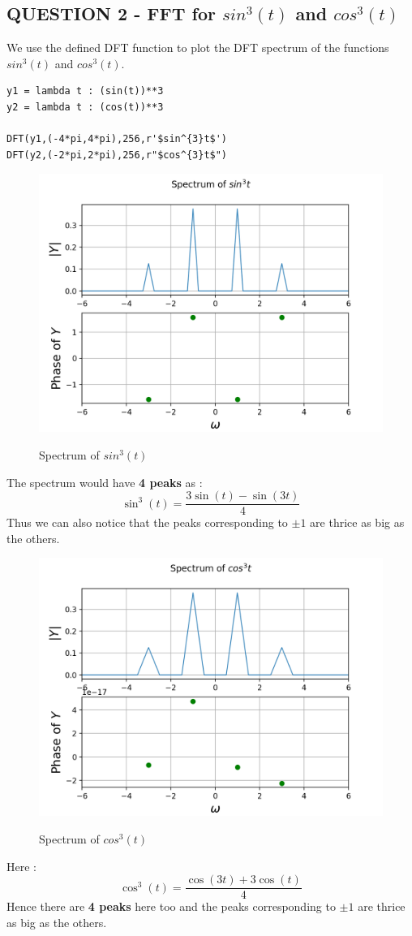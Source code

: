 \documentclass[11pt, a4paper]{article}
\begin{document}
\subsection{QUESTION 2 - FFT for $sin^{3}(t)$ and $cos^{3}(t)$}
{
We use the defined DFT function to plot the DFT spectrum of the functions $sin^{3}(t)$ and $cos^{3}(t)$.
}
\begin{verbatim}
y1 = lambda t : (sin(t))**3
y2 = lambda t : (cos(t))**3

DFT(y1,(-4*pi,4*pi),256,r'$sin^{3}t$')
DFT(y2,(-2*pi,2*pi),256,r"$cos^{3}t$")
\end{verbatim}
\begin{figure}[H]
   	\centering
   	\includegraphics[scale=0.8]{qn2_sin3.png}
   	\label{fig:qn2_sin3}
   	\caption{Spectrum of $sin^{3}(t)$}
\end{figure}
{
The spectrum would have \textbf{4 peaks} as :
\[ \sin^3(t) =\frac{3\sin(t)-\sin(3t)}{4} \]
Thus we can also notice that the peaks corresponding to $\pm 1$ are thrice as big as the others.
}
\begin{figure}[H]
   	\centering
   	\includegraphics[scale=0.8]{qn2_cos3.png}
   	\label{fig:qn2_cos3}
   	\caption{Spectrum of $cos^{3}(t)$}
\end{figure}
{
Here :
\[ \cos^3(t) =\frac{ \cos(3t) +3\cos(t)}{4} \]
Hence there are \textbf{4 peaks} here too and the peaks corresponding to $\pm 1$ are thrice as big as the others.
}
\end{document}
